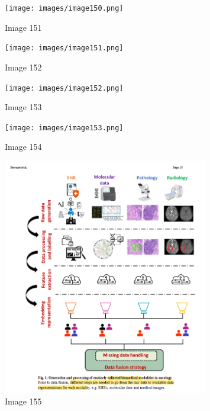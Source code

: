 \documentclass{article}%
\begin{document}
%


\begin{figure}[h!]%
\centering%
\texttt{[image: images/image150.png]}%
\caption{Image 151}%
\end{figure}

%


\begin{figure}[h!]%
\centering%
\texttt{[image: images/image151.png]}%
\caption{Image 152}%
\end{figure}

%


\begin{figure}[h!]%
\centering%
\texttt{[image: images/image152.png]}%
\caption{Image 153}%
\end{figure}

%


\begin{figure}[h!]%
\centering%
\texttt{[image: images/image153.png]}%
\caption{Image 154}%
\end{figure}

%


\begin{figure}[h!]%
\centering%
\includegraphics[width=0.8\textwidth]{images/image154.png}%
\caption{Image 155}%
\end{figure}

%
\end{document}
